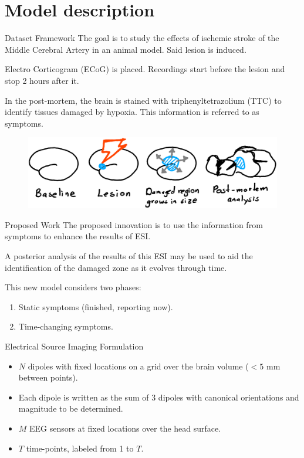 \documentclass[progressbar=head]{beamer}
\begin{document}
{
\section[Model]{Model description}
}

\begin{frame}{Dataset Framework}
The goal is to study the effects of
ischemic stroke of the Middle Cerebral Artery in an animal
model. 
Said lesion is induced.

Electro Corticogram (ECoG) is placed. Recordings start before the lesion and stop 2 hours after it.

In the post-mortem, the brain is stained with
triphenyltetrazolium (TTC)
to identify tissues damaged by hypoxia. This information is referred to as \alert{symptoms}.

\begin{figure}
\centering
\includegraphics[width=0.8\linewidth]{./img_oldbeamer/sketch01_v2}
\end{figure}
\end{frame}

\begin{frame}{Proposed Work}
The proposed innovation is to use the information from {symptoms} to enhance the results of ESI.

A posterior analysis of the results of this ESI may be used to aid the identification of the damaged zone as it evolves through time.

This new model considers two phases:
\begin{enumerate}
    \item Static symptoms (finished, reporting now).
    \item Time-changing symptoms.
\end{enumerate}
\end{frame}



\begin{frame}{Electrical Source Imaging Formulation}
\begin{itemize}
    \item $N$ dipoles with fixed locations on a grid over the brain volume ($<5$ mm between points).
    \item Each dipole is written as the sum of 3 dipoles with canonical orientations and magnitude to be determined.
    \item $M$ EEG sensors at fixed locations over the head surface.
    \item $T$ time-points, labeled from 1 to $T$.
\end{itemize}
\end{frame}
\end{document}
